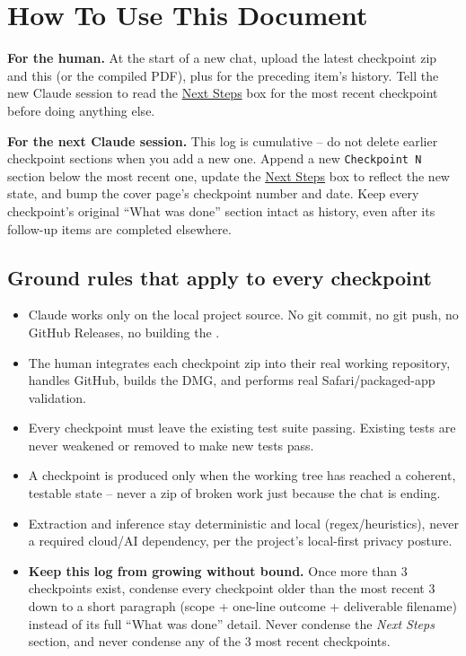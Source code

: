 \documentclass[11pt]{article}
\newcommand{\file}[1]{\texttt{\detokenize{#1}}}
\begin{document}
\setcounter{tocdepth}{1}
\tableofcontents
\newpage

\section{How To Use This Document}\label{sec:howto}

\begin{infobox}
\textbf{For the human.} At the start of a new chat, upload the latest checkpoint zip and this \file{.tex} (or the compiled PDF), plus \file{ITEM6_DEV_LOG.tex} for the preceding item's history. Tell the new Claude session to read the \hyperref[sec:next-steps]{Next Steps} box for the most recent checkpoint before doing anything else.
\end{infobox}

\begin{infobox}
\textbf{For the next Claude session.} This log is cumulative -- do not delete earlier checkpoint sections when you add a new one. Append a new \texttt{Checkpoint N} section below the most recent one, update the \hyperref[sec:next-steps]{Next Steps} box to reflect the new state, and bump the cover page's checkpoint number and date. Keep every checkpoint's original ``What was done'' section intact as history, even after its follow-up items are completed elsewhere.
\end{infobox}

\subsection{Ground rules that apply to every checkpoint}
\begin{itemize}
  \item Claude works only on the local project source. No git commit, no git push, no GitHub Releases, no building the \file{.dmg}.
  \item The human integrates each checkpoint zip into their real working repository, handles GitHub, builds the DMG, and performs real Safari/packaged-app validation.
  \item Every checkpoint must leave the existing test suite passing. Existing tests are never weakened or removed to make new tests pass.
  \item A checkpoint is produced only when the working tree has reached a coherent, testable state -- never a zip of broken work just because the chat is ending.
  \item Extraction and inference stay deterministic and local (regex/heuristics), never a required cloud/AI dependency, per the project's local-first privacy posture.
  \item \textbf{Keep this log from growing without bound.} Once more than 3 checkpoints exist, condense every checkpoint older than the most recent 3 down to a short paragraph (scope + one-line outcome + deliverable filename) instead of its full ``What was done'' detail. Never condense the \emph{Next Steps} section, and never condense any of the 3 most recent checkpoints.
\end{itemize}
\end{document}
